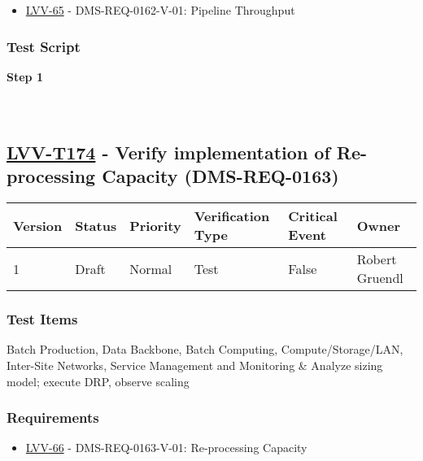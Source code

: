 \begin{itemize}
\tightlist
\item
  \href{https://jira.lsstcorp.org/browse/LVV-65}{LVV-65} -
  DMS-REQ-0162-V-01: Pipeline Throughput
\end{itemize}

\hypertarget{test-script-73}{%
\subsubsection{Test Script}\label{test-script-73}}

\textbf{Step 1}\\
~\\
~\\

\hypertarget{lvv-t174---verify-implementation-of-re-processing-capacity-dms-req-0163}{%
\subsection{\texorpdfstring{\href{https://jira.lsstcorp.org/secure/Tests.jspa\#/testCase/LVV-T174}{LVV-T174}
- Verify implementation of Re-processing Capacity
(DMS-REQ-0163)}{LVV-T174 - Verify implementation of Re-processing Capacity (DMS-REQ-0163)}}\label{lvv-t174---verify-implementation-of-re-processing-capacity-dms-req-0163}}

\begin{longtable}[]{@{}llllll@{}}
\toprule
Version & Status & Priority & Verification Type & Critical Event &
Owner\tabularnewline
\midrule
\endhead
1 & Draft & Normal & Test & False & Robert Gruendl\tabularnewline
\bottomrule
\end{longtable}

\hypertarget{test-items-74}{%
\subsubsection{Test Items}\label{test-items-74}}

Batch Production, Data Backbone, Batch Computing, Compute/Storage/LAN,
Inter-Site Networks, Service Management and Monitoring \& Analyze sizing
model; execute DRP, observe scaling

\hypertarget{requirements-74}{%
\subsubsection{Requirements}\label{requirements-74}}

\begin{itemize}
\tightlist
\item
  \href{https://jira.lsstcorp.org/browse/LVV-66}{LVV-66} -
  DMS-REQ-0163-V-01: Re-processing Capacity
\end{itemize}

